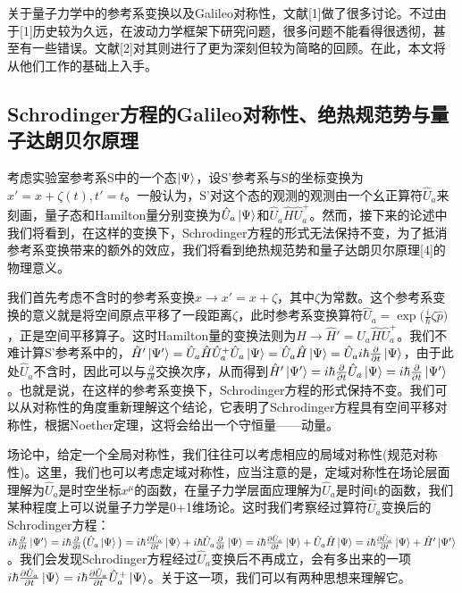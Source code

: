 \documentclass[a4paper]{article}
\begin{document}
        关于量子力学中的参考系变换以及Galileo对称性，文献[1]做了很多讨论。不过由于[1]历史较为久远，在波动力学框架下研究问题，很多问题不能看得很透彻，甚至有一些错误。文献[2]对其则进行了更为深刻但较为简略的回顾。在此，本文将从他们工作的基础上入手。

    \subsection{Schrodinger方程的Galileo对称性、绝热规范势与量子达朗贝尔原理}
        考虑实验室参考系S中的一个态$\ket{\Psi}$，设S'参考系与S的坐标变换为$x'=x+\zeta(t), t'=t$。一般认为，S'对这个态的观测的观测由一个幺正算符$\hat{U}_a$来刻画，量子态和Hamilton量分别变换为$\hat{U}_a\ket{\Psi}$和$\hat{U}_a\hat{H}\hat{U}_a^+$。然而，接下来的论述中我们将看到，在这样的变换下，Schrodinger方程的形式无法保持不变，为了抵消参考系变换带来的额外的效应，我们将看到绝热规范势和量子达朗贝尔原理[4]的物理意义。

        我们首先考虑不含时的参考系变换$x\rightarrow x'=x+\zeta$，其中$\zeta$为常数。这个参考系变换的意义就是将空间原点平移了一段距离$\zeta$，此时参考系变换算符$\hat{U}_a=\exp\big(\frac{i}{\hbar}\zeta\hat{p} \big)$，正是空间平移算子。这时Hamilton量的变换法则为$\hat{H}\rightarrow \hat{H}'=\hat{U}_a\hat{H}\hat{U}_a^+$。我们不难计算S'参考系中的，$\hat{H}'\ket{\Psi'}=\hat{U}_a\hat{H}\hat{U}_a^+\hat{U}_a\ket{\Psi}=\hat{U}_a\hat{H}\ket{\Psi}=\hat{U}_a i\hbar\frac{\partial}{\partial t}\ket{\Psi}$，由于此处$\hat{U}_a$不含时，因此可以与$\frac{\partial}{\partial t}$交换次序，从而得到$\hat{H}'\ket{\Psi'}=i\hbar\frac{\partial}{\partial t}\hat{U}_a\ket{\Psi}=i\hbar\frac{\partial}{\partial t}\ket{\Psi'}$。也就是说，在这样的参考系变换下，Schrodinger方程的形式保持不变。我们可以从对称性的角度重新理解这个结论，它表明了Schrodinger方程具有空间平移对称性，根据Noether定理，这将会给出一个守恒量——动量。

        场论中，给定一个全局对称性，我们往往可以考虑相应的局域对称性(规范对称性)。这里，我们也可以考虑定域对称性，应当注意的是，定域对称性在场论层面理解为$\hat{U}_a$是时空坐标$x^\mu$的函数，在量子力学层面应理解为$\hat{U}_a$是时间t的函数，我们某种程度上可以说量子力学是0+1维场论。这时我们考察经过算符$\hat{U}_a$变换后的Schrodinger方程：$i\hbar\frac{\partial}{\partial t}\ket{\Psi'} = i\hbar\frac{\partial}{\partial t}\big(\hat{U}_a\ket{\Psi}\big) = i\hbar\frac{\partial\hat{U}_a}{\partial t}\ket{\Psi} + i\hbar\hat{U}_a\frac{\partial}{\partial t}\ket{\Psi} = i\hbar\frac{\partial\hat{U}_a}{\partial t}\ket{\Psi} + \hat{U}_a\hat{H}\ket{\Psi} = i\hbar\frac{\partial\hat{U}_a}{\partial t}\ket{\Psi} + \hat{H}'\ket{\Psi'}$。我们会发现Schrodinger方程经过$\hat{U}_a$变换后不再成立，会有多出来的一项$i\hbar\frac{\partial\hat{U}_a}{\partial t}\ket{\Psi} = i\hbar\frac{\partial\hat{U}_a}{\partial t}\hat{U}_a^+\ket{\Psi}$。关于这一项，我们可以有两种思想来理解它。
\end{document}
